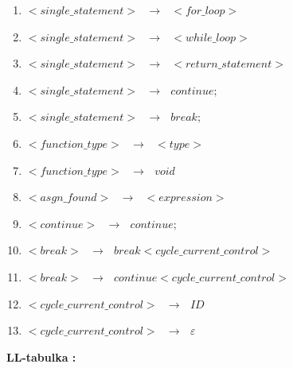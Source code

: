 \documentclass[12pt]{article}
\begin{document}
\begin{enumerate}
\item $ <single\_statement> \text{ }\to \text{ } <for\_loop>$
\item $<single\_statement> \text{ }\to \text{ } <while\_loop>$
\item $<single\_statement> \text{ }\to \text{ } <return\_statement>$
\item $<single\_statement> \text{ }\to \text{ }  continue ;$
\item $<single\_statement> \text{ }\to \text{ }  break ;$
\item $<function\_type> \text{ }\to \text{ } <type>$
\item $<function\_type> \text{ }\to \text{ } void$
\item $<asgn\_found> \text{ }\to \text{ } <expression> $
\item $<continue> \text{ }\to \text{ } continue ;$
\item $<break> \text{ }\to \text{ } break <cycle\_current\_control>$
\item $<break> \text{ }\to \text{ } continue <cycle\_current\_control>$
\item $<cycle\_current\_control> \text{ }\to \text{ } ID$
\item $<cycle\_current\_control> \text{ }\to \text{ } \varepsilon$

\end{enumerate}

\newpage

 \Large \textbf{LL-tabulka :}
\newline \\
\end{document}
